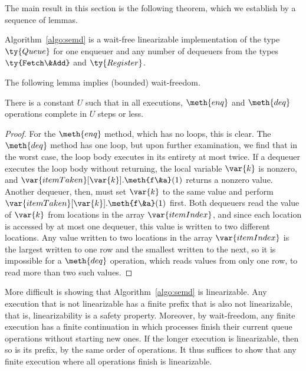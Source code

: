 The main result in this section is the following theorem, 
which we establish by a sequence of lemmas. 

\begin{theorem}
\label{theorem:correct}
Algorithm~\ref{algo:semd} 
is a wait-free linearizable implementation 
of the type $\ty{Queue}$ for one enqueuer and any number of dequeuers 
from the types $\ty{Fetch\&Add}$ and $\ty{Register}$. 
\end{theorem}

The following lemma implies (bounded) wait-freedom. 

\begin{lemma}
\label{lemma:waitfree}
There is a constant $U$ such that in all executions, 
$\meth{enq}$ and $\meth{deq}$ operations complete in $U$ steps or less. 
\end{lemma}
\begin{proof}
For the $\meth{enq}$ method, which has no loops, this is clear. 
The $\meth{deq}$ method has one loop, 
but upon further examination, 
we find that in the worst case, 
the loop body executes in its entirety at most twice.
If a dequeuer executes the loop body without returning, 
the local variable $\var{k}$ is nonzero, 
and $\var{itemTaken}[\var{k}].\meth{f\&a}(1)$ returns a nonzero value. 
Another dequeuer, then, must set $\var{k}$ to the same value 
and perform $\var{itemTaken}[\var{k}].\meth{f\&a}(1)$ first. 
Both dequeuers read the value of $\var{k}$ 
from locations in the array $\var{itemIndex}$, 
and since each location is accessed by at most one dequeuer, 
this value is written to two different locations. 
Any value written to two locations in the array $\var{itemIndex}$ 
is the largest written to one row 
and the smallest written to the next, 
so it is impossible for a $\meth{deq}$ operation, 
which reads values from only one row, 
to read more than two such values. 
\end{proof}

More difficult is showing that Algorithm~\ref{algo:semd} is linearizable. 
Any execution that is not linearizable 
has a finite prefix that is also not linearizable, 
that is, linearizability is a safety property. 
Moreover, by wait-freedom, 
any finite execution has a finite continuation 
in which processes finish their current queue operations 
without starting new ones. 
If the longer execution is linearizable, 
then so is its prefix, by the same order of operations. 
It thus suffices to show that any finite execution 
where all operations finish is linearizable. 

